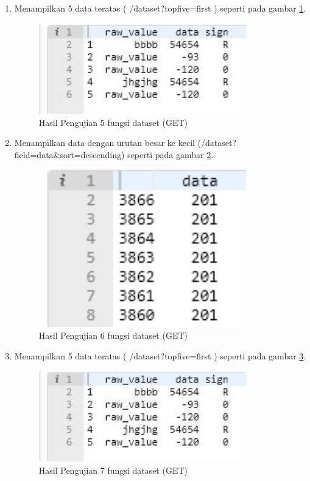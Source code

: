 \begin{enumerate}
\item Menampilkan 5 data teratas ( /dataset?topfive=first ) seperti pada gambar \ref{fig:hujifd5}.
\begin{figure}[!htbp]
	\centerline{\includegraphics[width=0.85\textwidth]{figures/10/hujifd5.PNG}}
	\caption{Hasil Pengujian 5 fungsi dataset (GET)}
	\label{fig:hujifd5}
\end{figure}

\item Menampilkan data dengan urutan besar ke kecil (/dataset?field=data\&sort=descending)
seperti pada gambar \ref{fig:hujifd6}.
\begin{figure}[!htbp]
	\centerline{\includegraphics[width=0.85\textwidth]{figures/10/hujifd6.PNG}}
	\caption{Hasil Pengujian 6 fungsi dataset (GET)}
	\label{fig:hujifd6}
\end{figure}

\item Menampilkan 5 data teratas ( /dataset?topfive=first ) seperti pada gambar \ref{fig:hujifd7}.
\begin{figure}[!htbp]
	\centerline{\includegraphics[width=0.85\textwidth]{figures/10/hujifd7.PNG}}
	\caption{Hasil Pengujian 7 fungsi dataset (GET)}
	\label{fig:hujifd7}
\end{figure}


\end{enumerate}
